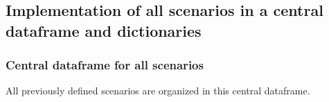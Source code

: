 \documentclass[10pt,parskip=half,
toc=sectionentrywithdots,
bibliography=totocnumbered,
captions=tableheading,numbers=noendperiod]{scrartcl}
\begin{document}
\hypertarget{implementation-of-all-scenarios-in-a-central-dataframe-and-dictionaries}{%
\subsection{Implementation of all scenarios in a central dataframe and
dictionaries}\label{implementation-of-all-scenarios-in-a-central-dataframe-and-dictionaries}}

\hypertarget{central-dataframe-for-all-scenarios}{%
\subsubsection{Central dataframe for all
scenarios}\label{central-dataframe-for-all-scenarios}}

All previously defined scenarios are organized in this central
dataframe.
\end{document}

